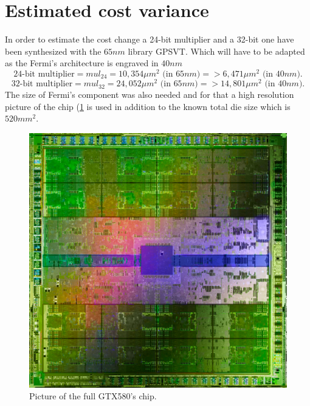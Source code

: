\documentclass{report}
\begin{document}
   \section{Estimated cost variance}
   In order to estimate the cost change a 24-bit multiplier and a 32-bit one have been synthesized with the $65nm$ library GPSVT. Which will have to be adapted as the Fermi's architecture is engraved in $40nm$ \cite{GTX580Datasheet}
   \[\text{24-bit multiplier} = mul_{24} = 10,354 \mu m^2 \text{ (in $65nm$)} => 6,471 \mu m^2 \text{ (in $40nm$)}.\]
   \[\text{32-bit multiplier} = mul_{32} = 24,052 \mu m^2 \text{ (in $65nm$)} => 14,801 \mu m^2 \text{ (in $40nm$)}.\]
   The size of Fermi's component was also needed and for that a high resolution picture of the chip (\ref{fig:fermiChip} is used in addition to the known total die size which is $520 mm^2$\cite{G5xxwiki}.
   \begin{figure}[H]
    \centering
        \includegraphics[width=0.7\linewidth]{pictures/FermiChip}
        \captionsetup{justification=centering}
        \caption{Picture of the full GTX580's chip.}
        \label{fig:fermiChip}
    \end{figure}
   
\end{document}
